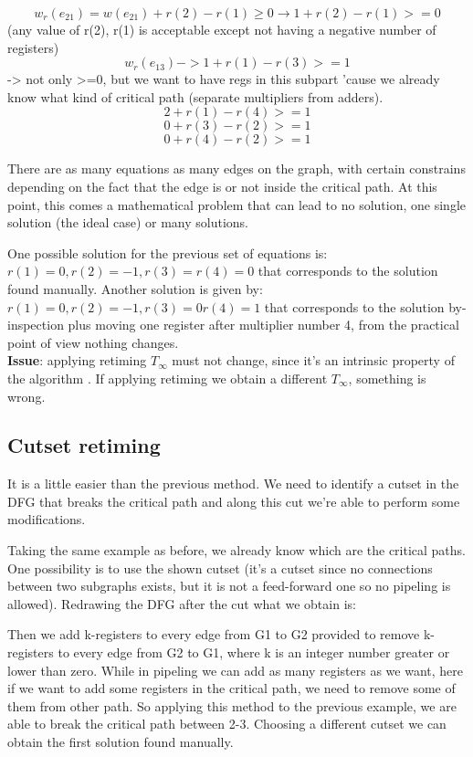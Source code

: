 $$w_r(e_{21}) = w(e_{21}) + r(2) -r(1) \geq 0  \rightarrow 1+r(2)-r(1) >=0$$ (any value of r(2), r(1) is acceptable except not having a negative number of registers)\\
$$w_r(e_{13}) -> 1+r(1)-r(3) >=1 $$ -> not only >=0, but we want to have regs in this subpart 'cause we already know what kind of critical path (separate multipliers from adders).
$$2+r(1)-r(4) >= 1$$
$$0+r(3)-r(2) >= 1$$
$$0+r(4)-r(2) >= 1$$

There are as many equations as many edges on the graph, with certain constrains depending on the fact that the edge is or not inside the critical path. At this point, this comes a mathematical problem that can lead to no solution, one single solution (the ideal case) or many solutions.

One possible solution for the previous set of equations is:
$r(1)=0, r(2)=-1, r(3)=r(4)=0$  that corresponds to the solution found manually.
Another solution is given by:
$r(1)=0, r(2)=-1, r(3)=0 r(4)=1$ that corresponds to the solution by-inspection plus moving one register after multiplier number 4, from the practical point of view nothing changes.\\

\textbf{Issue}: applying retiming $T_{\infty}$ must not change, since it's an intrinsic property of the algorithm . If applying retiming we obtain a different $T_{\infty}$, something is wrong.

\subsection{Cutset retiming}
It is a little easier than the previous method. We need to identify a cutset in the DFG that breaks the critical path and along this cut we're able to perform some modifications.

Taking the same example as before, we already know which are the critical paths. One possibility is to use the shown cutset (it's a cutset since no connections between two subgraphs exists, but it is not a feed-forward one so no pipeling is allowed). Redrawing the DFG after the cut what we obtain is:

Then we add k-registers to every edge from G1 to G2 provided to remove k-registers to every edge from G2 to G1, where k is an integer number greater or lower than zero. While in pipeling we can add as many registers as we want, here if we want to add some registers in the critical path, we need to remove some of them from other path. So applying this method to the previous example, we are able to break the critical path between 2-3. Choosing a different cutset we can obtain the first solution found manually.


